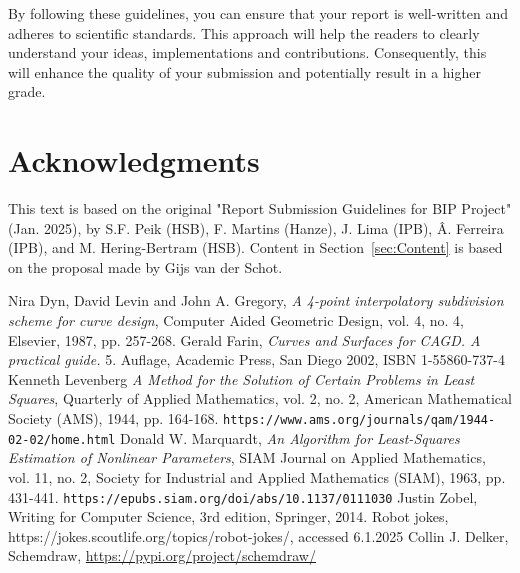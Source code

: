 \documentclass[conference]{IEEEtran}
\begin{document}
\noindent By following these guidelines, you can ensure that your report is well-written and adheres to scientific standards. This approach will help the readers to clearly understand your ideas, implementations and contributions. Consequently, this will enhance the quality of your submission and potentially result in a higher grade.

\section{Acknowledgments}
This text is based on the original "Report Submission Guidelines for BIP Project" (Jan. 2025), by S.F. Peik (HSB), F. Martins (Hanze), J. Lima (IPB), Â. Ferreira (IPB), and M. Hering-Bertram (HSB). Content in Section~\ref{sec:Content} is based on the proposal made by Gijs van der Schot.

\begin{thebibliography}{20} %
Nira Dyn, David Levin and John A. Gregory, 
{\it A 4-point interpolatory subdivision scheme for curve design}, 
Computer Aided Geometric Design, vol. 4, no. 4, Elsevier, 1987, pp. 257-268.
Gerald Farin, {\it Curves and Surfaces for CAGD. A practical guide.}
5. Auflage, Academic Press, San Diego 2002, ISBN 1-55860-737-4
Kenneth Levenberg {\it A Method for the Solution of Certain Problems in Least Squares},
Quarterly of Applied Mathematics, vol. 2, no. 2, American Mathematical Society (AMS), 1944, pp. 164-168.
{\tt https://www.ams.org/journals/qam/1944-02-02/home.html}
Donald W. Marquardt, {\it An Algorithm for Least-Squares Estimation of Nonlinear Parameters},
SIAM Journal on Applied Mathematics, vol. 11, no. 2, Society for Industrial and Applied Mathematics
(SIAM), 1963, pp. 431-441.
{\tt https://epubs.siam.org/doi/abs/10.1137/0111030}
 Justin Zobel, Writing for Computer Science, 3rd edition,
Springer, 2014.
 Robot jokes, https://jokes.scoutlife.org/topics/robot-jokes/, accessed 6.1.2025
 Collin J. Delker, Schemdraw, \url{https://pypi.org/project/schemdraw/}
\end{thebibliography}
\end{document}
